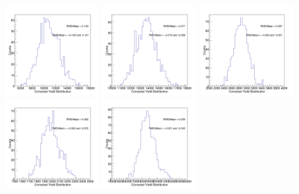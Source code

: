 \begin{figure}[h]
\begin{center}
\includegraphics[width= 0.32\textwidth]{Figures/Chapter5/BPCorrYield_0_90_7-10_Assym.png}
\includegraphics[width= 0.32\textwidth]{Figures/Chapter5/BPCorrYield_0_90_10-15_Assym.png}
\includegraphics[width= 0.32\textwidth]{Figures/Chapter5/BPCorrYield_0_90_15-20_Assym.png}
\includegraphics[width= 0.32\textwidth]{Figures/Chapter5/BPCorrYield_0_90_20-50_Assym.png}
\includegraphics[width= 0.32\textwidth]{Figures/Chapter5/BPCorrYield_0_90_10-50_Assym.png}

\end{center}
\end{figure}
